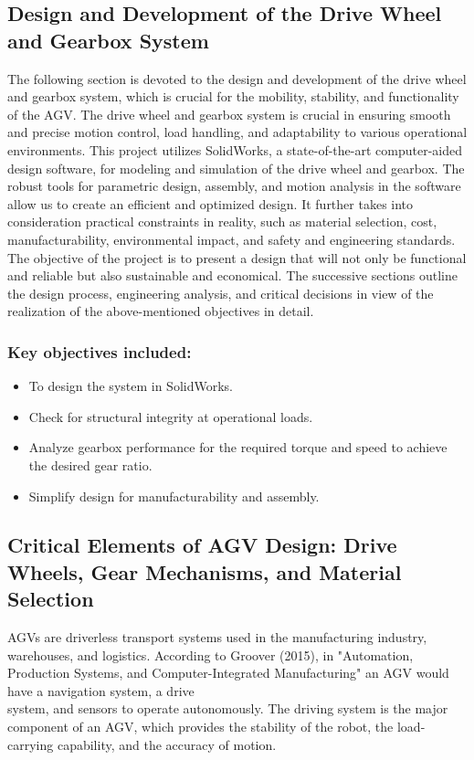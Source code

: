 \documentclass[../../main]{subfiles}
\begin{document}
\subsection{Design and Development of the Drive Wheel and Gearbox System}


The following section is devoted to the design and development of the drive wheel and gearbox system, which is crucial for the mobility, stability, and functionality of the AGV.
The drive wheel and gearbox system is crucial in ensuring smooth and precise motion control, load handling, and adaptability to various operational environments. This project utilizes SolidWorks, a state-of-the-art computer-aided design software, for modeling and simulation of the drive wheel and gearbox. The robust tools for parametric design, assembly, and motion analysis in the software allow us to create an efficient and optimized design. It further takes into consideration practical constraints in reality, such as material selection, cost, manufacturability, environmental impact, and safety and engineering standards.
The objective of the project is to present a design that will not only be functional and reliable but also sustainable and economical. The successive sections outline the design process, engineering analysis, and critical decisions in view of the realization of the above-mentioned objectives in detail.

\subsubsection*{Key objectives included:}

\begin{itemize}
\item
  To design the system in SolidWorks.
\item
  Check for structural integrity at operational loads.
\item
  Analyze gearbox performance for the required torque and speed to
  achieve the desired gear ratio.
\item
  Simplify design for manufacturability and assembly.
\end{itemize}
\newpage
\subsection[Critical Elements of AGV Design]{Critical Elements of AGV Design: Drive Wheels, Gear Mechanisms, and Material Selection}

AGVs are driverless transport systems used in the manufacturing
industry, warehouses, and logistics. According to Groover (2015)\cite{groover2016automation}, in
"Automation, Production Systems, and Computer-Integrated Manufacturing"
an AGV would have a navigation system, a drive \\system, and sensors to
operate autonomously. The driving system is the major component of an
AGV, which provides the stability of the robot, the load-carrying
capability, and the accuracy of motion.
\end{document}
